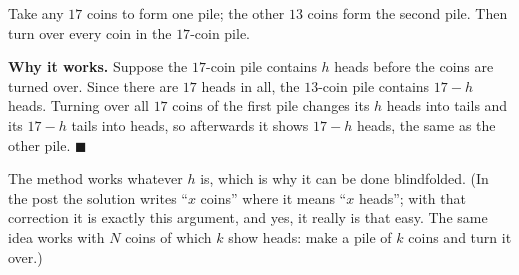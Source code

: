 Take any $17$ coins to form one pile; the other $13$ coins form the second pile. Then turn over every coin in the $17$-coin pile.

\textbf{Why it works.} Suppose the $17$-coin pile contains $h$ heads before the coins are turned over. Since there are $17$ heads in all, the $13$-coin pile contains $17-h$ heads. Turning over all $17$ coins of the first pile changes its $h$ heads into tails and its $17-h$ tails into heads, so afterwards it shows $17-h$ heads, the same as the other pile. $\blacksquare$

The method works whatever $h$ is, which is why it can be done blindfolded. (In the post the solution writes ``$x$ coins'' where it means ``$x$ heads''; with that correction it is exactly this argument, and yes, it really is that easy. The same idea works with $N$ coins of which $k$ show heads: make a pile of $k$ coins and turn it over.)
